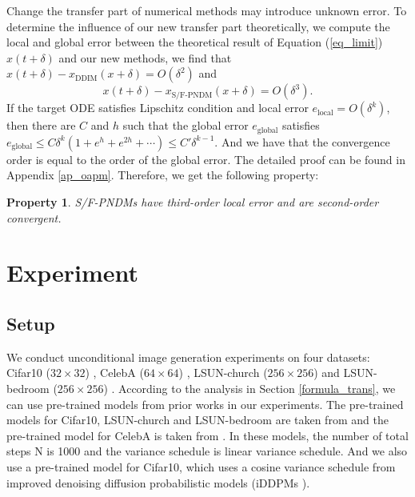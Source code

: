 \documentclass{article}
\newtheorem{property}{Property}[section]
\begin{document}
Change the transfer part of numerical methods may introduce unknown error. To determine the influence of our new transfer part theoretically, we compute the local and global error between the theoretical result of Equation (\ref{eq_limit}) $x(t+\delta)$ and our new methods, we find that $x(t+\delta) - x_{\text{DDIM}}(x+\delta) = O(\delta^2)$ and 
\begin{equation}
   x(t+\delta) - x_{\text{S/F-PNDM}}(x+\delta) = O(\delta^3).
\end{equation}
If the target ODE satisfies Lipschitz condition and local error $e_{\text{local}}=O(\delta^k)$, then there are $C$ and $h$ such that the global error $e_{\text{global}}$ satisfies $e_{\text{global}} \leq C\delta^k(1+e^{h}+e^{2h}+\cdots) \leq C'\delta^{k-1}$. And we have that the convergence order is equal to the order of the global error. The detailed proof can be found in Appendix \ref{ap_oapm}. Therefore, we get the following property:
\begin{property}
   S/F-PNDMs have third-order local error and are second-order convergent.
   \label{pro_conorder}
\end{property}











\section{Experiment}
\label{experiment}


\subsection{Setup}

We conduct unconditional image generation experiments on four datasets: Cifar10 ($32\times 32$) \citep{krizhevsky2009}, CelebA ($64\times 64$) \citep{liu2015}, LSUN-church ($256\times 256$) and LSUN-bedroom ($256\times 256$) \citep{yu2016}. According to the analysis in Section \ref{formula_trans}, we can use pre-trained models from prior works in our experiments. The pre-trained models for Cifar10, LSUN-church and LSUN-bedroom are taken from \citet{Ho2020} and the pre-trained model for CelebA is taken from \citet{Song2020a}. In these models, the number of total steps N is 1000 and the variance schedule is linear variance schedule. And we also use a pre-trained model for Cifar10, which uses a cosine variance schedule from improved denoising diffusion probabilistic models (iDDPMs \citep{Nichol2021}).
\end{document}
